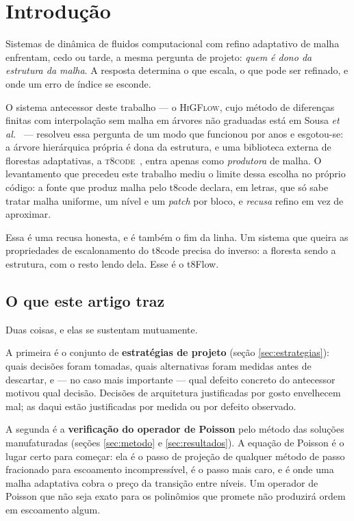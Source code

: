 \section{Introdução}
\label{sec:introducao}


Sistemas de dinâmica de fluidos computacional com refino adaptativo de malha
enfrentam, cedo ou tarde, a mesma pergunta de projeto: \emph{quem é dono da
estrutura da malha}. A resposta determina o que escala, o que pode ser refinado,
e onde um erro de índice se esconde.

O sistema antecessor deste trabalho --- o \textsc{HiGFlow}, cujo método de
diferenças finitas com interpolação sem malha em árvores não graduadas está em
Sousa \emph{et al.}~\cite{sousa2019} --- resolveu essa pergunta de um modo que
funcionou por anos e esgotou-se: a árvore hierárquica própria é dona da
estrutura, e uma biblioteca externa de florestas
adaptativas, a \textsc{t8code}~\cite{t8code}, entra apenas como \emph{produtora}
de malha. O levantamento que precedeu este trabalho mediu o limite dessa escolha
no próprio código: a fonte que produz malha pelo t8code declara, em letras, que
só sabe tratar malha uniforme, um nível e um \emph{patch} por bloco, e
\emph{recusa} refino em vez de aproximar.

Essa é uma recusa honesta, e é também o fim da linha. Um sistema que queira as
propriedades de escalonamento do t8code precisa do inverso: a floresta sendo a
estrutura, com o resto lendo dela. Esse é o t8Flow.

\subsection{O que este artigo traz}

Duas coisas, e elas se sustentam mutuamente.

A primeira é o conjunto de \textbf{estratégias de projeto} (seção
\ref{sec:estrategias}): quais decisões foram tomadas, quais alternativas foram
medidas antes de descartar, e --- no caso mais importante --- qual defeito
concreto do antecessor motivou qual decisão. Decisões de arquitetura justificadas
por gosto envelhecem mal; as daqui estão justificadas por medida ou por defeito
observado.

A segunda é a \textbf{verificação do operador de Poisson} pelo método das
soluções manufaturadas (seções \ref{sec:metodo} e \ref{sec:resultados}). A
equação de Poisson é o lugar certo para começar: ela é o passo de projeção de
qualquer método de passo fracionado para escoamento incompressível, é o passo
mais caro, e é onde uma malha adaptativa cobra o preço da transição entre níveis.
Um operador de Poisson que não seja exato para os polinômios que promete não
produzirá ordem em escoamento algum.


